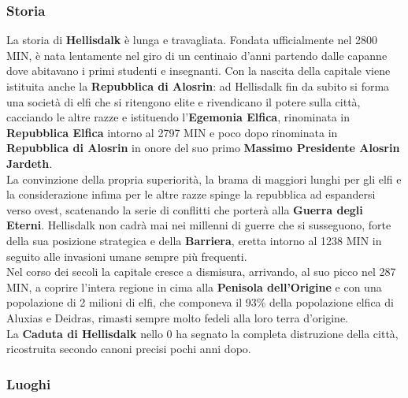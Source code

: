 \documentclass[10pt,twoside,onecolumn,openany]{book}
\begin{document}
\subsubsection{Storia}
La storia di \textbf{Hellisdalk} è lunga e travagliata. Fondata ufficialmente nel 2800 MIN, è nata lentamente nel giro di un centinaio d'anni partendo dalle capanne dove abitavano i primi studenti e insegnanti. Con la nascita della capitale viene istituita anche la \textbf{Repubblica di Alosrin}: ad Hellisdalk fin da subito si forma una società di elfi che si ritengono elite e rivendicano il potere sulla città, cacciando le altre razze e istituendo l'\textbf{Egemonia Elfica}, rinominata in \textbf{Repubblica Elfica} intorno al 2797 MIN e poco dopo rinominata in \textbf{Repubblica di Alosrin} in onore del suo primo \textbf{Massimo Presidente Alosrin Jardeth}.\\
La convinzione della propria superiorità, la brama di maggiori lunghi per gli elfi e la considerazione infima per le altre razze spinge la repubblica ad espandersi verso ovest, scatenando la serie di conflitti che porterà alla \textbf{Guerra degli Eterni}. Hellisdalk non cadrà mai nei millenni di guerre che si susseguono, forte della sua posizione strategica e della \textbf{Barriera}, eretta intorno al 1238 MIN in seguito alle invasioni umane sempre più frequenti.\\
Nel corso dei secoli la capitale cresce a dismisura, arrivando, al suo picco nel 287 MIN, a coprire l'intera regione in cima alla \textbf{Penisola dell'Origine} e con una popolazione di 2 milioni di elfi, che componeva il 93\% della popolazione elfica di Aluxias e Deidras, rimasti sempre molto fedeli alla loro terra d'origine.\\
La \textbf{Caduta di Hellisdalk} nello 0 ha segnato la completa distruzione della città, ricostruita secondo canoni precisi pochi anni dopo.
\subsubsection{Luoghi}
\end{document}
